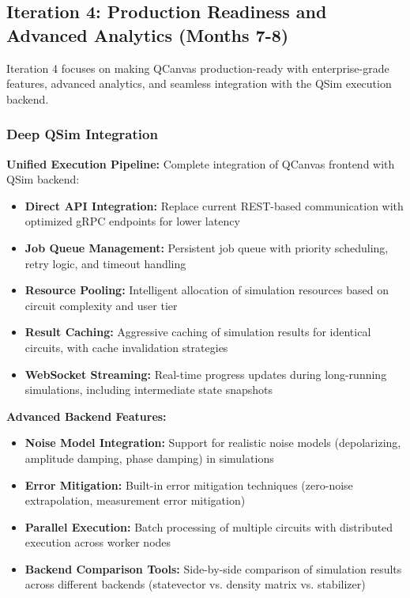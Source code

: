 \subsection{Iteration 4: Production Readiness and Advanced Analytics (Months 7-8)}

Iteration 4 focuses on making QCanvas production-ready with enterprise-grade features, advanced analytics, and seamless integration with the QSim execution backend.

\subsubsection{Deep QSim Integration}

\textbf{Unified Execution Pipeline:} Complete integration of QCanvas frontend with QSim backend:
\begin{itemize}
    \item \textbf{Direct API Integration:} Replace current REST-based communication with optimized gRPC endpoints for lower latency
    \item \textbf{Job Queue Management:} Persistent job queue with priority scheduling, retry logic, and timeout handling
    \item \textbf{Resource Pooling:} Intelligent allocation of simulation resources based on circuit complexity and user tier
    \item \textbf{Result Caching:} Aggressive caching of simulation results for identical circuits, with cache invalidation strategies
    \item \textbf{WebSocket Streaming:} Real-time progress updates during long-running simulations, including intermediate state snapshots
\end{itemize}

\textbf{Advanced Backend Features:}
\begin{itemize}
    \item \textbf{Noise Model Integration:} Support for realistic noise models (depolarizing, amplitude damping, phase damping) in simulations
    \item \textbf{Error Mitigation:} Built-in error mitigation techniques (zero-noise extrapolation, measurement error mitigation)
    \item \textbf{Parallel Execution:} Batch processing of multiple circuits with distributed execution across worker nodes
    \item \textbf{Backend Comparison Tools:} Side-by-side comparison of simulation results across different backends (statevector vs. density matrix vs. stabilizer)
\end{itemize}

